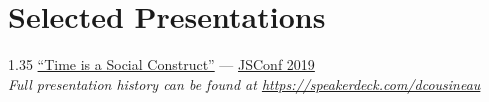 \documentclass{resume}
\begin{document}

\section{Selected Presentations}

\begin{spacing}{1.35}
  \href{https://speakerdeck.com/dcousineau/time-is-a-social-construct}{``Time is a Social Construct''} --- \href{https://2019.jsconf.us/speakers/daniel-cousineau}{JSConf 2019}\\
  \emph{Full presentation history can be found at \href{https://speakerdeck.com/dcousineau}{https://speakerdeck.com/dcousineau}}
\end{spacing}
\end{document}
